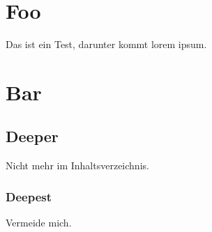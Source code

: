 \section{Foo}
\setauthor{\firstauthor}
Das ist ein Test, darunter kommt lorem ipsum. 

\lipsum[5-12]

\section{Bar}
\setauthor{\secondauthor}
\lipsum[12-18]

\subsection{Deeper}
Nicht mehr im Inhaltsverzeichnis.

\subsubsection{Deepest}
Vermeide mich.